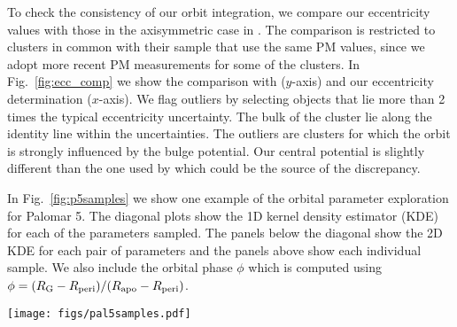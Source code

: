 \documentclass[useAMS,usenatbib,fleqn]{mnras}
\newcommand{\rg}{R_{\rm G}}
\newcommand{\rapo}{R_{\rm apo}}
\newcommand{\rperi}{R_{\rm peri}}
\newcommand{\comm}[1]{#1}
\begin{document}
To check the consistency of our orbit integration, we compare our eccentricity
values with those in the axisymmetric case in \citet{mpv14}. The comparison is
restricted to clusters in common with their sample that use the same PM values,
since we adopt more recent PM measurements for some of the clusters.  In
Fig.~\ref{fig:ecc_comp} we show the comparison with \citet{mpv14} ($y$-axis) and
our eccentricity determination ($x$-axis). We flag outliers by selecting objects
that lie more than 2 times the typical eccentricity uncertainty. The bulk of the
cluster lie along the identity line within the uncertainties. The outliers are
clusters for which the orbit is strongly influenced by the bulge potential. Our
central potential is slightly different than the one used by \citet{mpv14} which
could be the source of the discrepancy.

In Fig.~\ref{fig:p5samples} we show one example of the orbital parameter
exploration for Palomar 5. The diagonal plots show the 1D kernel density
estimator (KDE) for each of the parameters sampled. The panels below the
diagonal show the 2D KDE for each pair of parameters and the panels above show
each individual sample. We also include the orbital phase $\phi$ which is
computed using $\phi = (\rg - \rperi)/(\rapo- \rperi)$.

\begin{figure*}
\centering
\texttt{[image: figs/pal5samples.pdf]}
    \caption{\comm{Summary plot} showing the relation among all parameters explored in
    the orbit integration of Palomar 5 as an example. Panels below the diagonal
    show the 2D kernel density estimator for the samples, panels above the
    diagonal show the individual samples, and the diagonal shows the 1D kernel
    estimator with median (solid line) and MAD (dashed line) indicated.} 
\label{fig:p5samples}
\end{figure*}
\end{document}
